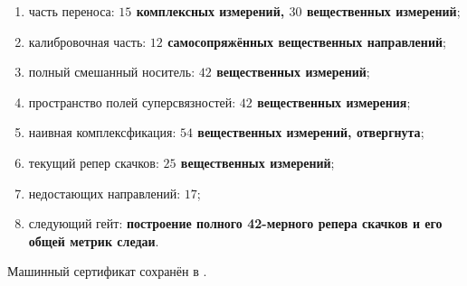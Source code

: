 \begin{protocol}
\begin{enumerate}
 \item часть переноса: \textbf{$15$ комплексных измерений, $30$ вещественных измерений};
 \item калибровочная часть: \textbf{$12$ самосопряжённых вещественных направлений};
 \item полный смешанный носитель: \textbf{$42$ вещественных измерений};
 \item пространство полей суперсвязностей: \textbf{$42$ вещественных измерения};
 \item наивная комплексфикация: \textbf{$54$ вещественных измерений, отвергнута};
 \item текущий репер скачков: \textbf{$25$ вещественных измерений};
 \item недостающих направлений: \textbf{$17$};
 \item следующий гейт: \textbf{построение полного 42-мерного репера скачков и
       его общей метрик следаи}.
\end{enumerate}
\end{protocol}

Машинный сертификат сохранён в
.